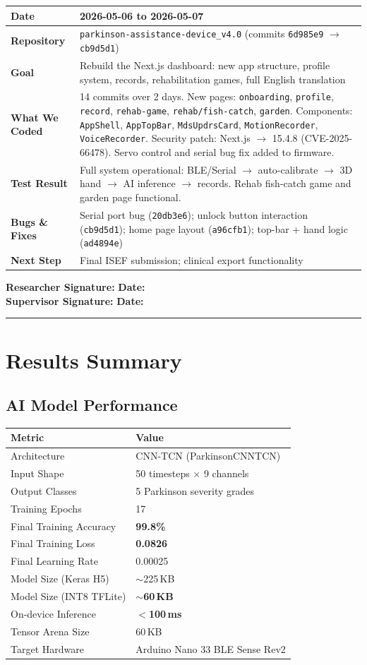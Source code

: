 \documentclass[12pt,a4paper]{article}
\makeatletter
\newcommand{\sigblock}{%
  \vspace{0.6em}
  \noindent\textbf{Researcher Signature:} \underline{\hspace{6cm}} \quad \textbf{Date:} \underline{\hspace{3cm}}\\[0.4em]
  \noindent\textbf{Supervisor Signature:} \underline{\hspace{6cm}} \quad \textbf{Date:} \underline{\hspace{3cm}}
  \vspace{0.4em}\hrule\vspace{0.6em}
}
\newenvironment{milestonetable}{%
  \begin{tcolorbox}[colback=codebg, colframe=codeframe, breakable, left=4pt, right=4pt, top=4pt, bottom=4pt]
  \begin{tabularx}{\linewidth}{@{}>{\bfseries}p{3.2cm} X@{}}
  \toprule
}{%
  \bottomrule
  \end{tabularx}
  \end{tcolorbox}
}
\newcommand{\mrow}[2]{\midrule #1 & #2 \\}
\makeatother
\begin{document}
\begin{milestonetable}
\mrow{Date}{2026-05-06 to 2026-05-07}
\mrow{Repository}{\texttt{parkinson-assistance-device\_v4.0} (commits \texttt{6d985e9} $\rightarrow$ \texttt{cb9d5d1})}
\mrow{Goal}{Rebuild the Next.js dashboard: new app structure, profile system, records, rehabilitation games, full English translation}
\mrow{What We Coded}{14 commits over 2 days. New pages: \texttt{onboarding}, \texttt{profile}, \texttt{record}, \texttt{rehab-game}, \texttt{rehab/fish-catch}, \texttt{garden}. Components: \texttt{AppShell}, \texttt{AppTopBar}, \texttt{MdsUpdrsCard}, \texttt{MotionRecorder}, \texttt{VoiceRecorder}. Security patch: Next.js $\rightarrow$ 15.4.8 (CVE-2025-66478). Servo control and serial bug fix added to firmware.}
\mrow{Test Result}{Full system operational: BLE/Serial $\rightarrow$ auto-calibrate $\rightarrow$ 3D hand $\rightarrow$ AI inference $\rightarrow$ records. Rehab fish-catch game and garden page functional.}
\mrow{Bugs \& Fixes}{Serial port bug (\texttt{20db3e6}); unlock button interaction (\texttt{cb9d5d1}); home page layout (\texttt{a96cfb1}); top-bar + hand logic (\texttt{ad4894e})}
\mrow{Next Step}{Final ISEF submission; clinical export functionality}
\end{milestonetable}

\sigblock

\section{Results Summary}

\subsection{AI Model Performance}
\begin{center}
\begin{tabular}{@{}ll@{}}
\toprule
\textbf{Metric} & \textbf{Value} \\
\midrule
Architecture            & CNN-TCN (ParkinsonCNNTCN) \\
Input Shape             & 50 timesteps $\times$ 9 channels \\
Output Classes          & 5 Parkinson severity grades \\
Training Epochs         & 17 \\
Final Training Accuracy & \textbf{99.8\%} \\
Final Training Loss     & \textbf{0.0826} \\
Final Learning Rate     & 0.00025 \\
Model Size (Keras H5)   & $\sim$225\,KB \\
Model Size (INT8 TFLite)& \textbf{$\sim$60\,KB} \\
On-device Inference     & \textbf{$<$100\,ms} \\
Tensor Arena Size       & 60\,KB \\
Target Hardware         & Arduino Nano 33 BLE Sense Rev2 \\
\bottomrule
\end{tabular}
\end{center}
\end{document}

